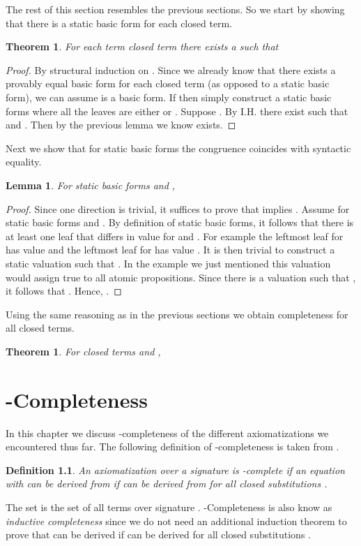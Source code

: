 \documentclass[a4paper,twoside,openright]{report}
\newtheorem{lem}[theorem]{Lemma}
\newtheorem{thm}[theorem]{Theorem}
\newtheorem{defn}[theorem]{Definition}
\begin{document}
The rest of this section resembles the previous sections. So we start by showing that there is a static basic form for each closed term.
\begin{thm}
For each term closed term  there exists a  such
that 

\end{thm}
\begin{proof}
By structural induction on . Since we already know that there exists a provably equal basic form for each closed term  (as opposed to a static basic form), we can assume  is a basic form. If  then simply construct a static basic forms where all the leaves are either  or .
Suppose . By I.H. there exist  such that  and . Then by the previous lemma we know  exists.
\end{proof}
Next we show that for static basic forms the congruence  coincides with syntactic equality.
\begin{lem}
For static basic forms  and ,

\end{lem}
\begin{proof}
Since one direction is trivial, it suffices to prove that  implies . Assume  for static basic forms  and . By definition of static basic forms, it follows that there is at least one leaf that differs in value for  and . For example the leftmost leaf for  has value  and the leftmost leaf for  has value . It is then trivial to construct a static valuation  such that . In the example we just mentioned this valuation would assign true to all atomic propositions. Since there is a valuation  such that , it follows that . Hence, .
\end{proof}
Using the same reasoning as in the previous sections we obtain completeness for all closed terms.
\begin{thm}
For closed terms  and ,

\end{thm}

\chapter{-Completeness}
In this chapter we discuss -completeness of the different axiomatizations we encountered thus far. The following definition of -completeness is taken from \cite{fokkink}.
\begin{defn}
An axiomatization  over a signature  is -complete if an equation  with  can be derived from  if  can be derived from  for all closed substitutions .
\end{defn}
The set  is the set of all terms over signature . -Completeness is also know as \emph{inductive completeness} since we do not need an additional induction theorem to prove that  can be derived if  can be derived for all closed substitutions .
\end{document}
